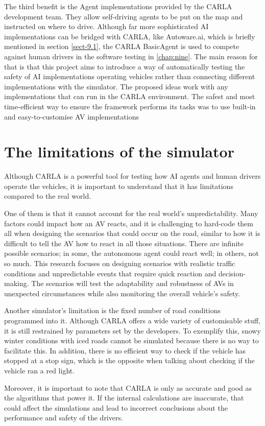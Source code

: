 The third benefit is the Agent implementations provided by the CARLA development team. They allow self-driving agents to be put on the map and instructed on where to drive. Although far more sophisticated AI implementations can be bridged with CARLA, like Autoware.ai, which is briefly mentioned in section \autoref{sect-9.1}, the CARLA BasicAgent is used to compete against human drivers in the software testing in \autoref{chap:nine}. The main reason for that is that this project aims to introduce a way of automatically testing the safety of AI implementations operating vehicles rather than connecting different implementations with the simulator. The proposed ideas work with any implementations that can run in the CARLA environment. The safest and most time-efficient way to ensure the framework performs its tasks was to use built-in and easy-to-customise AV implementations

\section{The limitations of the simulator} \label{sect-4.2}
Although CARLA is a powerful tool for testing how AI agents and human drivers operate the vehicles, it is important to understand that it has limitations compared to the real world.

One of them is that it cannot account for the real world's unpredictability. Many factors could impact how an AV reacts, and it is challenging to hard-code them all when designing the scenarios that could occur on the road, similar to how it is difficult to tell the AV how to react in all those situations. There are infinite possible scenarios; in some, the autonomous agent could react well; in others, not so much. This research focuses on designing scenarios with realistic traffic conditions and unpredictable events that require quick reaction and decision-making. The scenarios will test the adaptability and robustness of AVs in unexpected circumstances while also monitoring the overall vehicle's safety.

Another simulator's limitation is the fixed number of road conditions programmed into it. Although CARLA offers a wide variety of customisable stuff, it is still restrained by parameters set by the developers. To exemplify this, snowy winter conditions with iced roads cannot be simulated because there is no way to facilitate this. In addition, there is no efficient way to check if the vehicle has stopped at a stop sign, which is the opposite when talking about checking if the vehicle ran a red light.
 
Moreover, it is important to note that CARLA is only as accurate and good as the algorithms that power it. If the internal calculations are inaccurate, that could affect the simulations and lead to incorrect conclusions about the performance and safety of the drivers.
